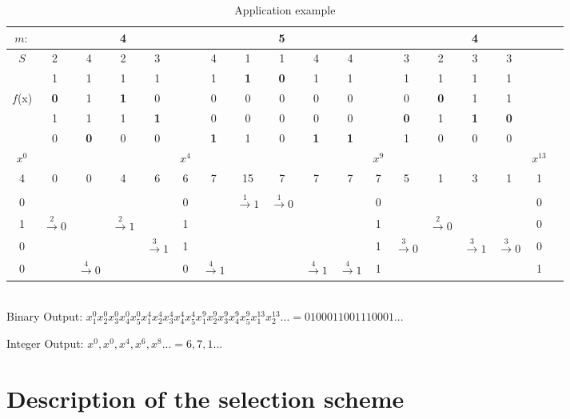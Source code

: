 \documentclass[conference]{IEEEtran}
\begin{document}
\begin{table*}
\centering
\begin{tabular}{|c|ccccc|cccccc|cccccc|}
\hline\hline
$m:$ & & & 4 & & & & & 5 & & & & & & 4 & & & \\ \hline
$S$ & 2 & 4 & 2 & 3 & & 4 & 1 & 1 & 4 & 4 & & 3 & 2 & 3 & 3 & & \\
\hline

& 1& 1& 1& 1&
 & 1& \textbf{1} & \textbf{0} &1 &1 &
 &1 & 1& 1&1 &
 & \\
$f$(x) & \textbf{0} & 1& \textbf{1} & 0 &
 &0 &0& 0&0 & 0&
 &0 &\textbf{0} & 1&1 & &\\
&1 & 1& 1& \textbf{1}&
 &0 &0 &0 &0 &0 &
& \textbf{0} & 1& \textbf{1} & \textbf{0} &
 & \\
&0 &\textbf{0} &0 &0 &
 &\textbf{1} &1 &0 &\textbf{1} &\textbf{1} &
 &1 &0 & 0&0 &
 &\\\hline
$x^{0}$ & & & & & $x^{4}$ & & & & & & $x^{9}$ & & & & & $x^{13}$ & \\
4 &0 &0 &4 &6&6 &7 &15 &7 &7 &7 &7&5  &1 &3 &1 &1 &  \\ & & & && & & & &
& &  & & & & & & \\
0 & & & & &
0 & & $\xrightarrow{1} 1$ & $\xrightarrow{1} 0$ & & &
0 & & & & &
0 & \\
1 & $\xrightarrow{2} 0$ & & $\xrightarrow{2} 1$ &  &
1 & & & & & &
1 & & $\xrightarrow{2} 0$ & & & 0 &\\
0 & & & & $\xrightarrow{3} 1$ &
1 & & & & & &
1 & $\xrightarrow{3} 0$ & & $\xrightarrow{3} 1$ & $\xrightarrow{3} 0$ &
0 &\\
0 & & $\xrightarrow{4} 0$ & & &
0 &$\xrightarrow{4} 1$ & & & $\xrightarrow{4} 1$&$\xrightarrow{4} 1$ &
1 & & & & &
1 &\\
\hline\hline
\end{tabular}\\
\vspace{0.5cm}
Binary Output:
$x_1^{0}x_2^{0}x_3^{0}x_4^{0}x_5^{0}x_1^{4}x_2^{4}x_3^{4}x_4^{4}x_5^{4}x_1^{9}x_2^{9}x_3^{9}x_4^{9}x_5^{9}x_1^{13}x_2^{13}... = 0100011001110001...$

Integer Output:
$x^{0},x^{0},x^{4},x^{6},x^{8}... = 6,7,1...$
\caption{Application example}
\label{table application example}
\end{table*}



\section{Description of the selection scheme}
\label{section:description}
\end{document}
